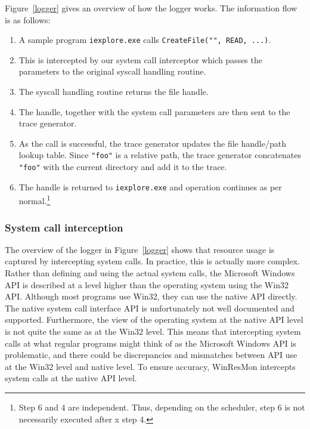 Figure~\ref{logger} gives an overview of how the logger works.
The information flow is as follows:

\begin{enumerate}
\item A sample program {\small\tt iexplore.exe} calls
{\small\tt CreateFile("", READ, ...)}.
\item This is intercepted by our system call interceptor
which passes the parameters to the original syscall handling routine.
\item The syscall handling routine returns the file handle.
\item The handle, together with the system call parameters are then sent to
the trace generator.
\item As the call is successful, the trace generator updates 
the file handle/path lookup table.
Since {\small\tt "foo"} is a relative path, the trace generator concatenates
{\small\tt "foo"} with the current directory and add it to the trace.
\item The handle is returned to {\small\tt iexplore.exe} and operation
continues as per normal.\footnote{Step 6 and 4 are independent.
Thus, depending on the scheduler, step 6 is not necessarily executed after
x
step 4.} 
\end{enumerate}


\subsubsection{System call interception}

The overview of the logger in Figure~\ref{logger} shows that resource usage is
captured by intercepting system calls.  In practice, this is actually more
complex.  Rather than defining and using the actual system calls, the
Microsoft Windows API is described at a level higher than the operating system
using the Win32 API.  Although most programs use Win32, they can use the
native API \cite{ntnativeapi} directly.  The native system call interface API
is unfortunately not well documented and supported.  Furthermore, the view of
the operating system at the native API level is not quite the same as at the
Win32 level.  This means that intercepting system calls at what regular
programs might think of as the Microsoft Windows API is problematic, and there
could be discrepancies and mismatches between API use at the Win32 level and
native level.  To ensure accuracy, WinResMon intercepts system calls at the
native API level.

